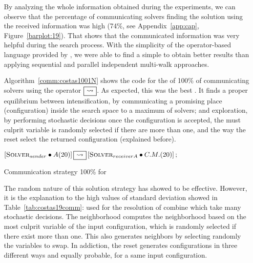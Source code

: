 By analyzing the whole information obtained during the experiments, we can observe that the percentage of communicating solvers finding the solution using the received information was high (74\%, see Appendix~\ref{app:cap}, Figure~\ref{barplot:19}). That shows that the communicated information was very helpful during the search process. 
With the simplicity of the operator-based language provided by \posl{}, we were able to find a simple \commstr{} to obtain better results than applying sequential and parallel independent multi-walk approaches. 

Algorithm~\ref{comm:costas1001N} shows the code for the \commstr{} of 100\% of communicating solvers using the \oneTn{} operator $\oneton$. %
As expected, this was the best \commstr{}. It finds a proper equilibrium between intensification, by communicating a promising place (configuration) inside the search space to a maximum of solvers; and exploration, by performing stochastic decisions once the configuration is accepted, \eg the must culprit variable is randomly selected if there are more than one, and the way the reset select the returned configuration (explained before).

\begin{algorithm}
\dontprintsemicolon
\SetNoline
$\left[\eqsolverposl{sender}\posldot A(20)\right] \oneton \left[\eqsolverposl{receiverA}\posldot C.M.(20)\right];$
\caption{Communication strategy \oneTn{} 100\% for \CARRP}\label{comm:costas1001N}
\end{algorithm}

The random nature of this solution strategy has showed to be effective. However, it is the explanation to the high values of standard deviation showed in Table~\ref{tab:costas19comm}: \ass{} used for the resolution of \CARRP{} combine \oms{} which take many stochastic decisions. The neighborhood \om{} computes the neighborhood based on the most culprit variable of the input configuration, which is randomly selected if there exist more than one. This \m{} also generates neighbors by selecting randomly the variables to swap. In addiction, the reset \om{} generates configurations in three different ways and equally probable, for a same input configuration.

